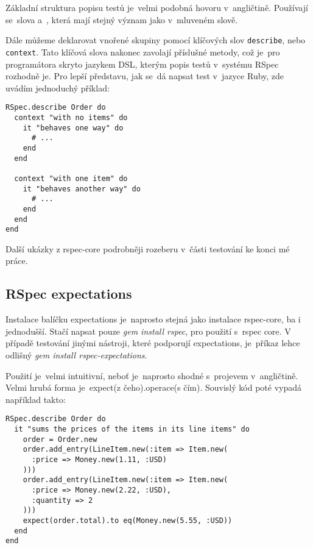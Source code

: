 \par Základní struktura popisu testů je~velmi podobná hovoru v~angličtině. Používají se~slova  a~, která mají stejný význam jako v~mluveném slově.

\par Dále můžeme deklarovat vnořené skupiny pomocí klíčových slov \texttt{describe}, nebo \texttt{context}. Tato klíčová slova nakonec zavolají příslušné metody, což je~pro programátora skryto jazykem DSL, kterým popis testů v~systému RSpec rozhodně je. Pro lepší představu, jak se~dá napsat test v~jazyce Ruby, zde uvádím jednoduchý příklad:
\begin{verbatim}
RSpec.describe Order do
  context "with no items" do
    it "behaves one way" do
      # ...
    end
  end

  context "with one item" do
    it "behaves another way" do
      # ...
    end
  end
end
\end{verbatim}
Další ukázky z rspec-core podrobněji rozeberu v~části testování ke konci mé práce.

\subsection{RSpec expectations}
\par Instalace balíčku expectations je~naprosto stejná jako instalace rspec-core, ba i jednodušší. Stačí napsat pouze \textit{gem install rspec}, pro použití s~rspec core. V případě testování jinými nástroji, které podporují expectations, je~příkaz lehce odlišný \textit{gem install rspec-expectations}.


\par Použití je~velmi intuitivní, neboť je~naprosto shodné s~projevem v~angličtině. Velmi hrubá forma je~expect(z čeho).operace(s čím). Souvislý kód poté vypadá například takto:
\begin{verbatim}
RSpec.describe Order do
  it "sums the prices of the items in its line items" do
    order = Order.new
    order.add_entry(LineItem.new(:item => Item.new(
      :price => Money.new(1.11, :USD)
    )))
    order.add_entry(LineItem.new(:item => Item.new(
      :price => Money.new(2.22, :USD),
      :quantity => 2
    )))
    expect(order.total).to eq(Money.new(5.55, :USD))
  end
end
\end{verbatim}

